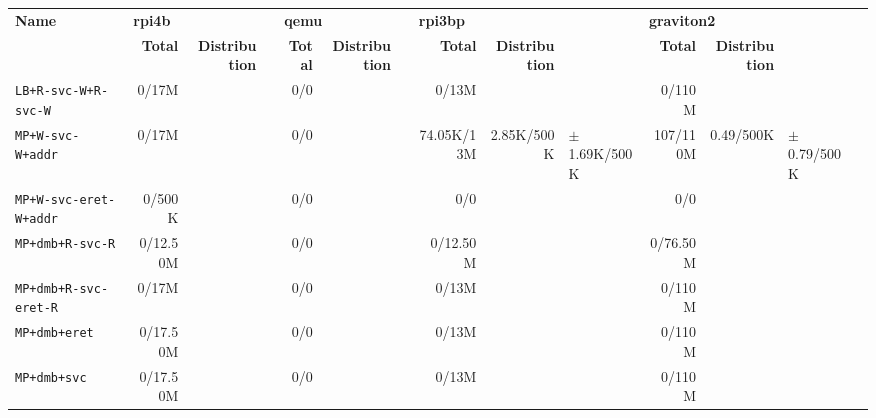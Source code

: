 \begin{tabular}{l  | r r l | r r l | r r l | r r l l}
   \textbf{Name}                  & \multicolumn{3}{l}{\textbf{rpi4b}}                       & \multicolumn{3}{l}{\textbf{qemu}}        & \multicolumn{3}{l}{\textbf{rpi3bp}}                         & \multicolumn{3}{l}{\textbf{graviton2}}                        & \\
                                  & \textbf{Total} & \textbf{Distribution} &                 & \textbf{Total} & \textbf{Distribution} &  & \textbf{Total} & \textbf{Distribution} &                   & \textbf{Total} & \textbf{Distribution} &                  & \\
        \verb|LB+R-svc-W+R-svc-W| &          0/17M &                       &                 &            0/0 &                       &  &          0/13M &                       &                   &         0/110M &                       &                  & \\ \hline 
           \verb|MP+W-svc-W+addr| &          0/17M &                       &                 &            0/0 &                       &  &     74.05K/13M &            2.85K/500K &  $\pm$ 1.69K/500K &       107/110M &             0.49/500K &  $\pm$ 0.79/500K & \\ \hline 
      \verb|MP+W-svc-eret-W+addr| &         0/500K &                       &                 &            0/0 &                       &  &            0/0 &                       &                   &            0/0 &                       &                  & \\ \hline 
            \verb|MP+dmb+R-svc-R| &       0/12.50M &                       &                 &            0/0 &                       &  &       0/12.50M &                       &                   &       0/76.50M &                       &                  & \\ \hline 
       \verb|MP+dmb+R-svc-eret-R| &          0/17M &                       &                 &            0/0 &                       &  &          0/13M &                       &                   &         0/110M &                       &                  & \\ \hline 
               \verb|MP+dmb+eret| &       0/17.50M &                       &                 &            0/0 &                       &  &          0/13M &                       &                   &         0/110M &                       &                  & \\ \hline 
                \verb|MP+dmb+svc| &       0/17.50M &                       &                 &            0/0 &                       &  &          0/13M &                       &                   &         0/110M &                       &                  & \\ \hline 

\end{tabular}
